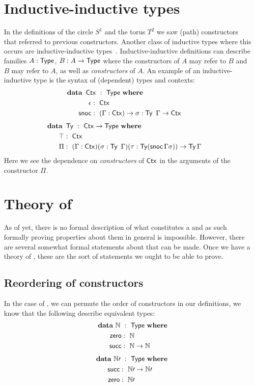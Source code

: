 \documentclass[a4paper,10pt]{report}
\begin{document}
\section{Inductive-inductive types}
\label{sec:inductiveinductive}

In the definitions of the circle $S^1$ and the torus $T^2$ we saw
(path) constructors that referred to previous constructors. Another
class of inductive types where this occurs are inductive-inductive
types~\cite{Altenkirch2011}. Inductive-inductive definitions can
describe families $A : \mathsf{Type}$, $B : A \to \mathsf{Type}$ where the
constructors of $A$ may refer to $B$ and $B$ may refer to $A$, as well
as \emph{constructors} of $A$. An example of an inductive-inductive
type is the syntax of (dependent) types and contexts:
%
\begin{alignat*}{2}
  &\rlap{$\data\ \Ctx\ :\ \Type\ \where$} \\
  &&\ \ \epsilon &:\ \Ctx \\
  &&\ \ \snoc    &:\ (\Gamma : \Ctx) \to \sigma : \Ty\ \Gamma \to \Ctx
\end{alignat*}
%
\begin{alignat*}{2}
  &\rlap{$\data\ \Ty\ :\ \Ctx \to \Type\ \where$} \\
  &&\ \ \unitty &:\ \Ctx \\
  &&\ \ \Pi     &:\ (\Gamma : \Ctx) (\sigma : \Ty\ \Gamma) (\tau : \Ty (\snoc \Gamma \sigma)) \to \Ty \Gamma
\end{alignat*}
%
Here we see the dependence on \emph{constructors} of $\operatorname{\mathsf{Ctx}}$ in the
arguments of the constructor $\Pi$.

\section{Theory of \hits}
\label{sec:theoryhits}

As of yet, there is no formal description of what constitutes a \hit
and as such formally proving properties about them in general is
impossible. However, there are several somewhat formal statements
about \hits that can be made. Once we have a theory of \hits, these
are the sort of statements we ought to be able to prove.

\subsection{Reordering of constructors}

In the case of \oits, we can permute the order of constructors in our
definitions, \ie we know that the following describe equivalent types:
%
\begin{alignat*}{2}
  &\rlap{$\data\ \Nat\ :\ \Type\ \where$} \\
  &&\ \ \zero &:\ \Nat \\
  &&\ \ \suc  &:\ \Nat \to \Nat
\end{alignat*}
%
\begin{alignat*}{2}
  &\rlap{$\data\ \Nat \prime\ :\ \Type\ \where$} \\
  &&\ \ \suc  &:\ \Nat \prime \to \Nat \prime \\
  &&\ \ \zero &:\ \Nat \prime
\end{alignat*}
\end{document}
